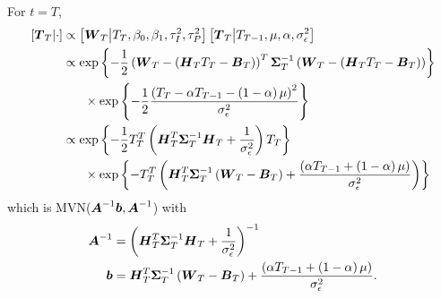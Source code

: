 \documentclass{article}\usepackage[]{graphicx}\usepackage[]{color}
\def\bm#1{\mbox{\boldmath $#1$}}
\begin{document}
%
For $t = T$,
%
\begin{align*}
%
\left[ \bm{T}_T \middle| \cdot \right] & \propto \left[ \bm{W}_T \middle| T_T, \beta_0, \beta_1, \tau^2_I, \tau^2_P \right] \left[ \bm{T}_T \middle| T_{T - 1}, \mu, \alpha, \sigma^2_\epsilon \right] \\
%
& \propto \exp{ \left\{ - \frac{1} {2} \left( \bm{W}_T - \left( \bm{H}_T T_T - \bm{B}_T \right) \right)^T \bm{\Sigma}_T^{ - 1} \left( \bm{W}_T - \left( \bm{H}_T T_T - \bm{B}_T \right)  \right) \right\} }\\
& \hspace{6mm} \times \exp{ \left\{ - \frac{1} {2} \frac{\left( T_T - \alpha T_{T - 1} - \left( 1 - \alpha \right) \mu \right)^2 } {\sigma^2_\epsilon} \right\} }\\
%
& \propto \exp{ \left\{ - \frac{1} {2} T_T^T \left(\bm{H}_T^T \bm{\Sigma}_T^{ - 1} \bm{H}_T +  \frac{1} {\sigma^2_\epsilon} \right) T_T \right\} }\\
& \hspace{6mm} \times \exp{ \left\{ - T_T^T \left( \bm{H}_T^T \bm{\Sigma}_T^{ - 1} \left( \bm{W}_T - \bm{B}_T \right) + \frac{ \left( \alpha T_{T - 1} + \left( 1 - \alpha \right) \mu \right)} {\sigma^2_\epsilon} \right) \right\} }
%
\end{align*}
%
which is MVN($\bm{A}^{ - 1}\bm{b}, \bm{A}^{ - 1}$) with \\
\begin{align*}
%
\bm{A}^{ - 1} & = \left( \bm{H}_T^T \bm{\Sigma}_T^{ - 1} \bm{H}_T +  \frac{1} {\sigma^2_\epsilon} \right)^{ - 1}\\
%
\bm{b} & =  \bm{H}_T^T \bm{\Sigma}_T^{ - 1} \left( \bm{W}_T - \bm{B}_T \right) + \frac{\left( \alpha T_{T - 1} + \left( 1 - \alpha \right) \mu \right)} {\sigma^2_\epsilon} .\\
%
\end{align*}
%
%
\end{document}
